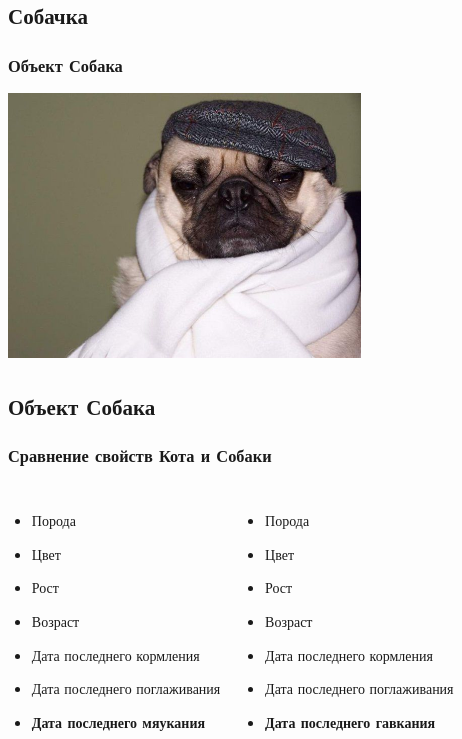 \documentclass[compress,red]{beamer}
\begin{document}
\subsection{Собачка}
\begin{frame}[fragile]
  \frametitle{Объект Собака}
  \centerline{\includegraphics[width=0.7\textwidth]{images/dog.jpg}}
\end{frame}

\subsection{Объект Собака}
\begin{frame}[fragile]
  \frametitle{Сравнение свойств Кота и Собаки}
  \begin{columns}[ll]
    \column{2.0in}
      \begin{itemize}
        \item Порода
        \item Цвет
        \item Рост
        \item Возраст
        \item Дата последнего кормления
        \item Дата последнего поглаживания
        \item \textbf{Дата последнего мяукания}      
      \end{itemize}
    \column{2.0in}
      \begin{itemize}
        \item Порода
        \item Цвет
        \item Рост
        \item Возраст
        \item Дата последнего кормления
        \item Дата последнего поглаживания
        \item \textbf{Дата последнего гавкания}      
      \end{itemize}
  \end{columns}
\end{frame}
\end{document}

